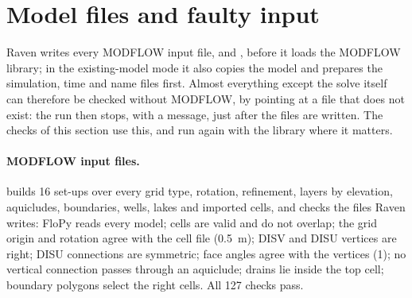 \section{Model files and faulty input}\label{sec:mf6files}
Raven writes every MODFLOW input file, and , before it loads the MODFLOW library; in the
existing-model mode it also copies the model and prepares the simulation, time and name files first. Almost everything
except the solve itself can therefore be checked without MODFLOW, by pointing  at a file that does not
exist: the run then stops, with a message, just after the files are written. The checks of this section use this, and
run again with the library where it matters.

\paragraph{MODFLOW input files.}  builds 16 set-ups over every grid type, rotation,
refinement, layers by elevation, aquicludes, boundaries, wells, lakes and imported cells, and checks the files Raven
writes: FloPy reads every model; cells are valid and do not overlap; the grid origin and rotation agree with the cell file
(0.5~m); DISV and DISU vertices are right; DISU connections are symmetric; face angles agree with the vertices
(1\textdegree); no vertical connection passes through an aquiclude; drains lie inside the top cell; boundary polygons
select the right cells. All 127 checks pass.

